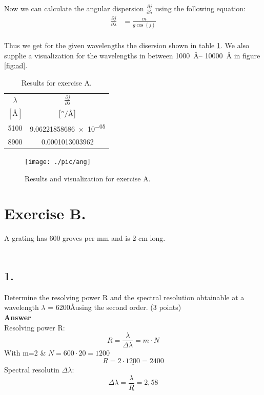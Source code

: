 \documentclass[11pt,a4paper,twoside]{article}
\begin{document}
Now we can calculate the angular dispersion $\frac{\partial j}{\partial\lambda}$ 
using the following equation:
\begin{align}
    \frac{\partial j}{\partial \lambda} &= \frac{m}{g\cos(j)}    \\
\end{align}

Thus we get for the given wavelengths the disersion shown in table \ref{tab:ad}.
We also supplie a visualization for the wavelengths in between \SIrange{1000}{
10000}{\angstrom} in figure \ref{fig:ad}.
\begin{table}[h!]
\centering
\begin{tabular}{cc}\toprule
    $\lambda$   & $\frac{\partial j}{\partial \lambda}$  \\
    $\left[\si{\angstrom}\right]$ 
                & $\left[\si[per-mode=symbol]{\degree\per\angstrom}\right]$ \\
    \midrule
    5100        &   \num[round-mode=places, round-precision=4]{9.06221858686e-05} \\
    8900        &   \num[round-mode=places, round-precision=4]{0.0001013003962}   \\
\bottomrule
\end{tabular}
\caption{Results for exercise A.}
\label{tab:ad}
\end{table}

\begin{figure}
\centering
\texttt{[image: ./pic/ang]}
\caption{Results and visualization for exercise A.}
\end{figure}

\section*{Exercise B.}
A grating has 600 groves per mm 
and is 2 cm long.\\
\\
\subsection*{1.} Determine the resolving power R and the spectral resolution obtainable at a wavelength 
$\lambda$ = 6200\AA\hspace{0.06cm}using the second order. (3 points)\\
\textbf{Answer}\\
Resolving power R:\\
\begin{equation}
R=\frac{\lambda}{\Delta\lambda}=m\cdot N
\end{equation}
With m=2 \& $N=600\cdot 20 =1200$
\begin{equation}
\underline{R=2\cdot 1200=2400}
\end{equation}
Spectral resolutin $\Delta\lambda$:
\begin{equation}
\underline{\Delta\lambda=\frac{\lambda}{R}=2,58}
\end{equation}
\\
\end{document}
